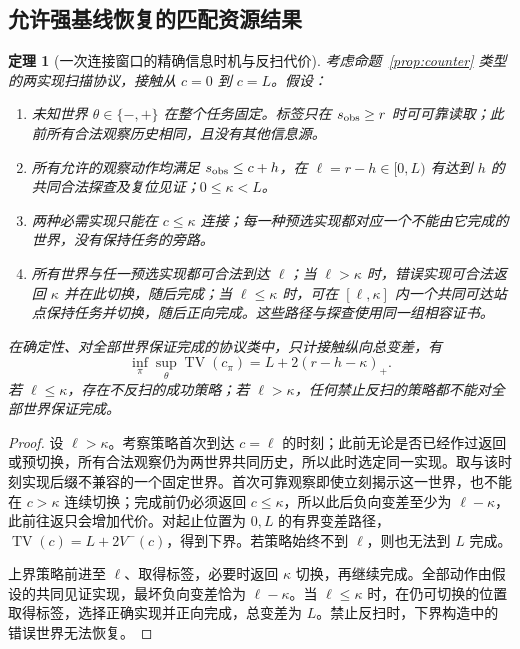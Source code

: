 \documentclass[11pt,a4paper]{article}
\theoremstyle{cn}
\newtheorem{theorem}{定理}
\newcommand{\pos}[1]{\left(#1\right)_+}
\newcommand{\TV}{\operatorname{TV}}
\begin{document}
\subsection{允许强基线恢复的匹配资源结果}

\begin{theorem}[一次连接窗口的精确信息时机与反扫代价]
\label{thm:cost}
考虑命题~\ref{prop:counter} 类型的两实现扫描协议，接触从 \(c=0\) 到 \(c=L\)。假设：
\begin{enumerate}
\item 未知世界 \(\theta\in\{-,+\}\) 在整个任务固定。标签只在 \(s_{\rm obs}\ge r\) 时可可靠读取；此前所有合法观察历史相同，且没有其他信息源。
\item 所有允许的观察动作均满足 \(s_{\rm obs}\le c+h\)，在 \(\ell=r-h\in[0,L)\) 有达到 \(h\) 的共同合法探查及复位见证；\(0\le\kappa<L\)。
\item 两种必需实现只能在 \(c\le\kappa\) 连接；每一种预选实现都对应一个不能由它完成的世界，没有保持任务的旁路。
\item 所有世界与任一预选实现都可合法到达 \(\ell\)；当 \(\ell>\kappa\) 时，错误实现可合法返回 \(\kappa\) 并在此切换，随后完成；当 \(\ell\le\kappa\) 时，可在 \([\ell,\kappa]\) 内一个共同可达站点保持任务并切换，随后正向完成。这些路径与探查使用同一组相容证书。
\end{enumerate}
在确定性、对全部世界保证完成的协议类中，只计接触纵向总变差，有
\begin{equation}
\inf_\pi\sup_{\theta}\TV(c_\pi)=L+2\pos{r-h-\kappa}.
\label{eq:exact}
\end{equation}
若 \(\ell\le\kappa\)，存在不反扫的成功策略；若 \(\ell>\kappa\)，任何禁止反扫的策略都不能对全部世界保证完成。
\end{theorem}

\begin{proof}
设 \(\ell>\kappa\)。考察策略首次到达 \(c=\ell\) 的时刻；此前无论是否已经作过返回或预切换，所有合法观察仍为两世界共同历史，所以此时选定同一实现。取与该时刻实现后缀不兼容的一个固定世界。首次可靠观察即使立刻揭示这一世界，也不能在 \(c>\kappa\) 连续切换；完成前仍必须返回 \(c\le\kappa\)，所以此后负向变差至少为 \(\ell-\kappa\)，此前往返只会增加代价。对起止位置为 \(0,L\) 的有界变差路径，
\(\TV(c)=L+2V^-(c)\)，得到下界。若策略始终不到 \(\ell\)，则也无法到 \(L\) 完成。

上界策略前进至 \(\ell\)、取得标签，必要时返回 \(\kappa\) 切换，再继续完成。全部动作由假设的共同见证实现，最坏负向变差恰为 \(\ell-\kappa\)。当 \(\ell\le\kappa\) 时，在仍可切换的位置取得标签，选择正确实现并正向完成，总变差为 \(L\)。禁止反扫时，下界构造中的错误世界无法恢复。
\end{proof}
\end{document}

